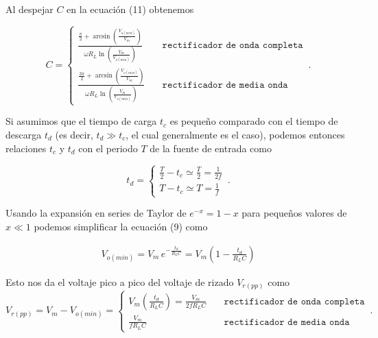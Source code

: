\documentclass[12pt]{article}
\begin{document}
	\noindent Al despejar $C$ en la ecuación (11) obtenemos
	\begin{tcolorbox}[colback=red!5!white,colframe=red!75!black,arc=0mm,boxrule=0mm,width=(\linewidth+0.5cm)]
		\begin{equation}
			C = 
			\begin{cases}
				\frac{\frac{\pi}{2} + \arcsin \left( \frac{V_{o(min)}}{V_m} \right) }{\omega R_L \ln \left( \frac{V_m}{V_{o(min)}} \right)} \quad & \texttt{rectificador de onda completa}\\
				\frac{\frac{3\pi}{2} + \arcsin \left( \frac{V_{o(min)}}{V_m} \right) }{\omega R_L \ln \left( \frac{V_m}{V_{o(min)}} \right)} \quad & \texttt{rectificador de media onda}
			\end{cases}\,.
		\end{equation}
	\end{tcolorbox}
	
	\noindent Si asumimos que el tiempo de carga $t_c$ es pequeño comparado con el tiempo de descarga  $t_d$ (es decir, $t_d \gg t_c$, el cual generalmente es el caso), podemos entonces relaciones $t_c$ y $t_d$ con el periodo $T$ de la fuente de entrada como
	
	\begin{equation}
		t_d =  
		\begin{cases}
			\frac{T}{2} - t_c \simeq \frac{T}{2} = \frac{1}{2f}\\
			T - t_c  \simeq T = \frac{1}{f}
		\end{cases}\,.
	\end{equation}
	
	\noindent Usando la expansión en series de Taylor de $e^{-x} = 1-x$ para pequeños valores de $x \ll 1$ podemos simplificar la ecuación (9) como
	
	\begin{align}
		V_{o(min)} = V_m \, e^{- \frac{t_d}{R_L C}} = V_m \left( 1 - \frac{t_d}{R_L C} \right)
	\end{align}
	
	\noindent Esto nos da el voltaje pico a pico del voltaje de rizado $V_{r(pp)}$ como
	\begin{equation}
		V_{r(pp)} = V_m  - V_{o(min)} =   
		\begin{cases}
		V_m \left( \frac{t_d}{R_L C} \right)= \frac{V_m}{2fR_L C} \quad & \texttt{rectificador de onda completa}\\
			\frac{V_m}{fR_L C} \quad & \texttt{rectificador de media onda}
		\end{cases}\,.
	\end{equation}
	
\end{document}
